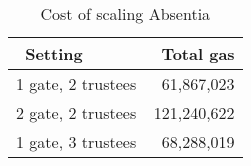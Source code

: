 
\begin{table}[t]
		\centering
	\begin{tabular}{|l|r|}
	\hline
	~\textbf{Setting}	& ~\textbf{Total gas}  \\ \hline
	1 gate, 2 trustees	& 61,867,023  \\ \hline
	2 gate, 2 trustees	&  121,240,622 \\ \hline
	1 gate, 3 trustees	& 68,288,019 \\ \hline
\end{tabular}
	\caption{Cost of scaling Absentia}
	\label{tab:settings}
\end{table}